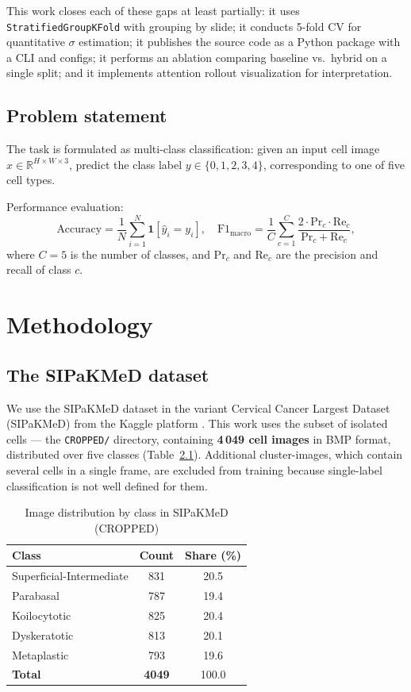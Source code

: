 \documentclass[14pt,a4paper]{extreport}
\begin{document}
This work closes each of these gaps at least partially: it uses
\texttt{StratifiedGroupKFold} with grouping by slide; it conducts 5-fold
CV for quantitative $\sigma$ estimation; it publishes the source code as
a Python package with a CLI and configs; it performs an ablation
comparing baseline vs.\ hybrid on a single split; and it implements
attention rollout visualization for interpretation.

\section{Problem statement}

The task is formulated as multi-class classification: given an input
cell image $x \in \mathbb{R}^{H \times W \times 3}$, predict the class
label $y \in \{0,1,2,3,4\}$, corresponding to one of five cell types.

Performance evaluation:
\[
    \text{Accuracy} = \frac{1}{N}\sum_{i=1}^{N}\mathbf{1}[\hat{y}_i = y_i],
    \quad
    \text{F1}_{\text{macro}} = \frac{1}{C}\sum_{c=1}^{C}
        \frac{2 \cdot \text{Pr}_c \cdot \text{Re}_c}
             {\text{Pr}_c + \text{Re}_c},
\]
where $C=5$ is the number of classes, and $\text{Pr}_c$ and
$\text{Re}_c$ are the precision and recall of class $c$.

\chapter{Methodology}
\label{ch:methodology}

\section{The SIPaKMeD dataset}

We use the SIPaKMeD dataset \cite{plissiti2018sipakmed} in the variant
Cervical Cancer Largest Dataset (SIPaKMeD) from the Kaggle platform
\cite{kaggle_sipakmed}. This work uses the subset of isolated cells ---
the \texttt{CROPPED/} directory, containing \textbf{4\,049 cell images}
in BMP format, distributed over five classes
(Table~\ref{tab:dataset}). Additional cluster-images, which contain
several cells in a single frame, are excluded from training because
single-label classification is not well defined for them.

\begin{table}[H]
\centering
\caption{Image distribution by class in SIPaKMeD (CROPPED)}
\label{tab:dataset}
\begin{tabular}{lcc}
\toprule
Class & Count & Share (\%) \\
\midrule
Superficial-Intermediate & 831  & 20.5 \\
Parabasal                & 787  & 19.4 \\
Koilocytotic             & 825  & 20.4 \\
Dyskeratotic             & 813  & 20.1 \\
Metaplastic              & 793  & 19.6 \\
\midrule
\textbf{Total}           & \textbf{4049} & 100.0 \\
\bottomrule
\end{tabular}
\end{table}
\end{document}
